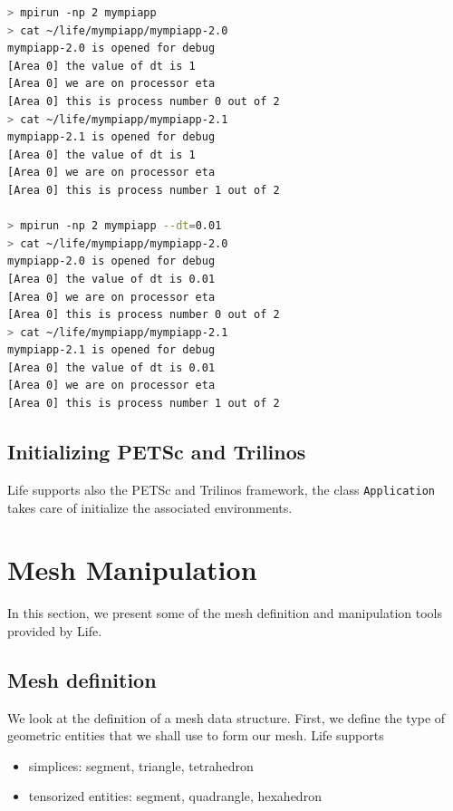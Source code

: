 \documentclass[a4paper]{book}
\newcommand{\life}{Life\xspace}
\begin{document}
\begin{lstlisting}[language=sh]
> mpirun -np 2 mympiapp
> cat ~/life/mympiapp/mympiapp-2.0
mympiapp-2.0 is opened for debug
[Area 0] the value of dt is 1
[Area 0] we are on processor eta
[Area 0] this is process number 0 out of 2
> cat ~/life/mympiapp/mympiapp-2.1
mympiapp-2.1 is opened for debug
[Area 0] the value of dt is 1
[Area 0] we are on processor eta
[Area 0] this is process number 1 out of 2

> mpirun -np 2 mympiapp --dt=0.01
> cat ~/life/mympiapp/mympiapp-2.0
mympiapp-2.0 is opened for debug
[Area 0] the value of dt is 0.01
[Area 0] we are on processor eta
[Area 0] this is process number 0 out of 2
> cat ~/life/mympiapp/mympiapp-2.1
mympiapp-2.1 is opened for debug
[Area 0] the value of dt is 0.01
[Area 0] we are on processor eta
[Area 0] this is process number 1 out of 2
\end{lstlisting}

\subsection{Initializing PETSc and Trilinos}


\life supports also the PETSc and Trilinos framework, the class
\lstinline!Application! takes care of
initialize the associated environments.

\section{Mesh Manipulation}
\label{sec:mesh-manipulation}

In this section, we present some of the mesh definition and
manipulation tools provided by \life.

\subsection{Mesh definition}

We look at the definition of a mesh data structure. First, we define
the type of geometric entities that we shall use to form our mesh. \life supports
\begin{itemize}
\item simplices: segment, triangle, tetrahedron
\item tensorized entities: segment, quadrangle, hexahedron
\end{itemize}
\end{document}
